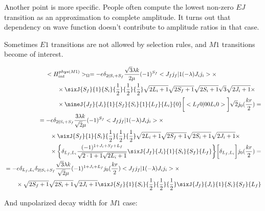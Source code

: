 Another point is more specific. People often compute the lowest non-zero $EJ$ transition as an approximation to complete amplitude. It turns out that dependency on wave function doesn't contribute to amplitude ratios in that case.

Sometimes $E1$ transitions are not allowed by selection rules, and $M1$ transitions become of interest.

\begin{align}
    \begin{split}
        &<H_{int}^{phys (M1)}>_\Omega = -e \delta_{2 \nmid S_i + S_f} \frac{\sqrt{3} \lambda k}{2 \mu} (-1)^{S_f} <J_f j_f | 1 (-\lambda) J_i j_i> \times \\
        &\qquad\times \sixJ{S_f}{1}{S_i}{\frac{1}{2}}{\frac{1}{2}}{\frac{1}{2}} \sqrt{2L_i + 1} \sqrt{2S_f + 1} \sqrt{2S_i+1} \sqrt{3} \sqrt{2J_i + 1} \times \\
        &\qquad\times \nineJ{J_f}{J_i}{1}{S_f}{S_i}{1}{L_f}{L_i}{0} \bigg[ <L_f 0 | 0 0 L_i 0> \bigg] \sqrt{2} j_{0}(\frac{kr}{2}) = 
    \end{split} \\
    \begin{split}
        &= -e \delta_{2 \nmid S_i + S_f} \frac{3 \lambda k}{\sqrt{2} \mu} (-1)^{S_f} <J_f j_f | 1 (-\lambda) J_i j_i> \times \\
        &\qquad\times \sixJ{S_f}{1}{S_i}{\frac{1}{2}}{\frac{1}{2}}{\frac{1}{2}} \sqrt{2L_i + 1} \sqrt{2S_f + 1} \sqrt{2S_i+1} \sqrt{2J_i + 1} \times \\
        &\qquad\times \bigg\{ \delta_{L_f, L_i} \frac{(-1)^{1+J_i+S_f+L_f}}{\sqrt{2 \cdot 1+1}\sqrt{2L_i + 1}} \sixJ{J_f}{J_i}{1}{S_i}{S_f}{L_f} \bigg\} \bigg[ \delta_{L_f, L_i} \bigg] j_{0}(\frac{kr}{2}) =
    \end{split} \\
    \begin{split}
        &= -e \delta_{L_f, L_i} \delta_{2 \nmid S_i + S_f} \frac{\sqrt{3} \lambda k}{\sqrt{2} \mu} (-1)^{1+J_i+L_f} j_{0}(\frac{kr}{2}) <J_f j_f | 1 (-\lambda) J_i j_i> \times \\
        &\qquad\times \sqrt{2S_f + 1} \sqrt{2S_i+1} \sqrt{2J_i + 1} \sixJ{S_f}{1}{S_i}{\frac{1}{2}}{\frac{1}{2}}{\frac{1}{2}} \sixJ{J_f}{J_i}{1}{S_i}{S_f}{L_f}
    \end{split}
\end{align}

And unpolarized decay width for $M1$ case:

